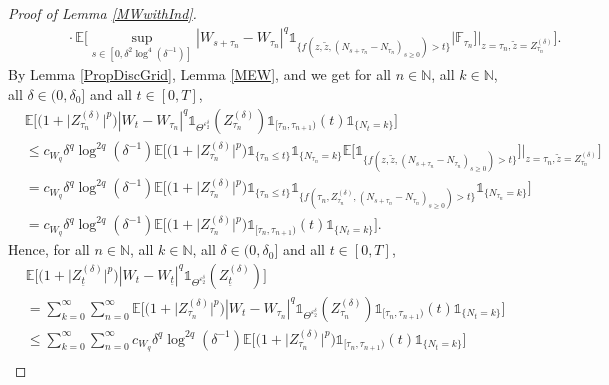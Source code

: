 \documentclass[11pt,a4paper]{article}
\numberwithin{equation}{section}
\theoremstyle{definition}
\newcommand{\E}{{\mathbb{E}}}
\newcommand{\N}{{\mathbb{N}}}
\newcommand{\F}{\mathbb{F}}
\begin{document}
\begin{proof}[Proof of Lemma \ref{MWwithInd}]
\begin{equation}
\begin{aligned}
    &\quad\quad\quad \cdot\E\Big[ \sup_{s\in[0,\delta^2\log^4(\delta^{-1})]} |W_{s+\tau_n}-W_{\tau_n}|^q  \mathds{1}_{\{f(z,\widetilde z, (N_{s+\tau_n}-N_{\tau_n})_{s\geq 0})> t\}}  \Big| \F_{\tau_n} \Big]\Big|_{z =\tau_n, \widetilde z =Z^{(\delta)}_{\tau_n} } \Big].
    \end{aligned}
\end{equation}
By Lemma \ref{PropDiscGrid}, Lemma \ref{MEW}, and \cite[p.~33]{Grikhman2004} we get for all $n\in\N$, all $k\in\N$, all $\delta\in(0,\delta_0]$ and all $t\in[0,T]$,
\begin{equation}
    \begin{aligned}
    &\E\big[\big(1+ \big|Z^{(\delta)}_{\tau_n}\big|^p\big)   |W_t-W_{\tau_n}|^q \mathds{1}_{\Theta^{\varepsilon_2^\delta}}(Z_{\tau_n}^{(\delta)})  \mathds{1}_{[\tau_n,\tau_{n+1})}(t)  \mathds{1}_{\{N_t = k\}} \big]\\
    &\leq c_{W_q} \delta^q \log^{2q}(\delta^{-1}) \E\Big[\big(1+ \big|Z^{(\delta)}_{\tau_n}\big|^p\big) \mathds{1}_{\{\tau_n \leq t\}} \mathds{1}_{\{N_{\tau_n} = k\}} \E\Big[ \mathds{1}_{\{f(z,\widetilde z, (N_{s+\tau_n}-N_{\tau_n})_{s\geq0})> t\}} \Big]\Big|_{z =\tau_n, \widetilde z =Z^{(\delta)}_{\tau_n}} \Big]\\
    &= c_{W_q} \delta^q \log^{2q}(\delta^{-1}) \E\Big[\big(1+ \big|Z^{(\delta)}_{\tau_n}\big|^p\big) \mathds{1}_{\{\tau_n \leq t\}}  \mathds{1}_{\{f(\tau_n,Z^{(\delta)}_{\tau_n}, (N_{s+\tau_n}-N_{\tau_n})_{s\geq0})> t\}} \mathds{1}_{\{N_{\tau_n} = k\}} \Big]\\
    &= c_{W_q} \delta^q \log^{2q}(\delta^{-1}) \E\Big[\big(1+ \big|Z^{(\delta)}_{\tau_n}\big|^p\big) \mathds{1}_{[\tau_n, \tau_{n+1})}(t)  \mathds{1}_{\{N_{t} = k\}} \Big].
    \end{aligned}
\end{equation}
Hence, for all $n\in\N$, all $k\in\N$, all $\delta\in(0,\delta_0]$ and all $t\in[0,T]$,
\begin{equation}
    \begin{aligned}
    &\E\Big[ \big(1+ \big|Z^{(\delta)}_{\underline{t}}\big|^p\big)   |W_t-W_{\underline{t}}|^q \mathds{1}_{\Theta^{\varepsilon_2^\delta}}(Z_{\underline t}^{(\delta)})\Big]\\
    &= \sum_{k=0}^\infty \sum_{n=0}^{\infty} \E\Big[ \big(1+ \big|Z^{(\delta)}_{\tau_n}\big|^p\big)   |W_t-W_{\tau_n}|^q \mathds{1}_{\Theta^{\varepsilon_2^\delta}}(Z_{\tau_n}^{(\delta)}) \mathds{1}_{[\tau_n,\tau_{n+1})}(t) \mathds{1}_{\{N_t=k\}} \Big]\\
    &\leq \sum_{k=0}^\infty \sum_{n=0}^{\infty} c_{W_q} \delta^q \log^{2q}(\delta^{-1}) \E\Big[\big(1+ \big|Z^{(\delta)}_{\tau_n}\big|^p\big) \mathds{1}_{[\tau_n, \tau_{n+1}) }(t)  \mathds{1}_{\{N_{t} = k\}} \Big]\\

\end{aligned}
\end{equation}
\end{proof}
\end{document}

